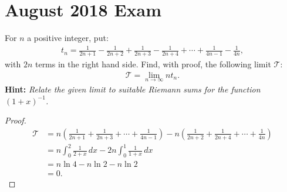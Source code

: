 \documentclass[11pt]{article}
\theoremstyle{definition}
\numberwithin{equation}{subsection}
\begin{document}
\section{August 2018 Exam}
For $n$ a positive integer, put:
\begin{align*}
    t_n = \frac{1}{2n + 1} - \frac{1}{2n + 2} + \frac{1}{2n + 3} - \frac{1}{2n + 4} + \cdots + \frac{1}{4n - 1} - \frac{1}{4n},
\end{align*}
with $2n$ terms in the right hand side. Find, with proof, the following limit $\mathcal{T}$:
\begin{align*}
    \mathcal{T} = \lim_{n\to\infty} nt_n.
\end{align*}
{\bf Hint:} {\em Relate the given limit to suitable Riemann sums for the function $(1 + x)^{-1}$.}
\begin{proof}
\begin{align*}
    \mathcal{T} & = n \left(\frac{1}{2n + 1} + \frac{1}{2n + 3} + \cdots + \frac{1}{4n - 1}\right) - n \left(\frac{1}{2n + 2} + \frac{1}{2n + 4} + \cdots +  \frac{1}{4n}\right) \\
    & = n \int^2_0 \frac{1}{2 + x}\, dx - 2n \int^1_0 \frac{1}{1 + x}\, dx \\
    & = n\ln 4 - n\ln 2 - n\ln 2 \\
    & = 0.
\end{align*}
\end{proof}

\medskip
\end{document}
